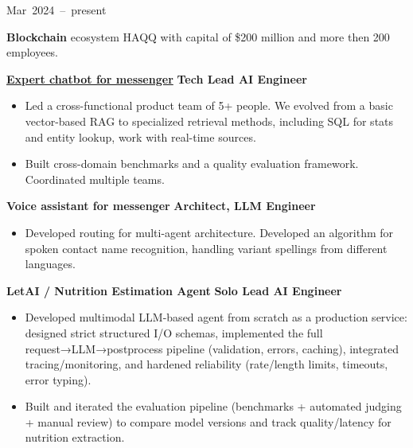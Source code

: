 \documentclass[a4paper,12pt]{article}
\begin{document}
\normalsize
\hfill \mbox{Mar 2024 -- present}\par


\footnotesize \textbf{Blockchain} ecosystem HAQQ with capital of \$200 million and more then 200 employees.\par

\noindent\textbf{\href{https://www.mmapp.org/}{Expert chatbot for messenger}}
\hfill \textbf{Tech Lead AI Engineer}\par
\begin{itemize}[nosep,leftmargin=1em,itemsep=2pt]
  \item[--] Led a cross-functional product team of 5+ people. We evolved from a basic vector-based RAG to specialized retrieval methods, including SQL for stats and entity lookup, work with real-time sources.
  \item[--] Built cross-domain benchmarks and a quality evaluation framework. Coordinated multiple teams.
\end{itemize}

\noindent\textbf{Voice assistant for messenger}
\hfill \textbf{Architect, LLM Engineer}\par
\begin{itemize}[nosep,leftmargin=1em,itemsep=2pt]
  \item[--] Developed routing for multi-agent architecture. Developed an algorithm for spoken contact name recognition, handling variant spellings from different languages.
\end{itemize}

\noindent\textbf{LetAI / Nutrition Estimation Agent}
\hfill \textbf{Solo Lead AI Engineer}\par
\begin{itemize}[nosep,leftmargin=1em,itemsep=2pt]
  \item[--] Developed multimodal LLM-based agent from scratch as a production service: designed strict structured I/O schemas, implemented the full request→LLM→postprocess pipeline (validation, errors, caching), integrated tracing/monitoring, and hardened reliability (rate/length limits, timeouts, error typing).
  \item[--] Built and iterated the evaluation pipeline (benchmarks + automated judging + manual review) to compare model versions and track quality/latency for nutrition extraction.

\end{itemize}
\end{document}
